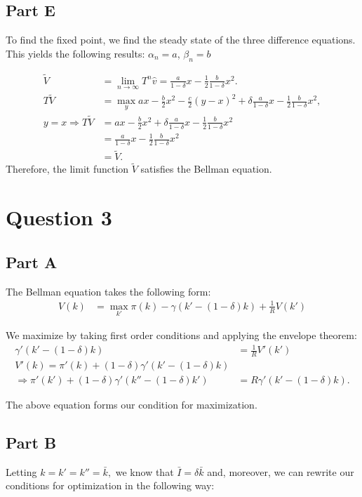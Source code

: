 \documentclass[11pt]{article} %
\begin{document}
\subsection{Part E}
To find the fixed point, we find the steady state of the three difference equations. This yields the following results: $\alpha_n = a$, $\beta_n = b$

\begin{align*}
\tilde{V} &= \lim_{n\rightarrow \infty} T^n \hat{v} = \frac{a}{1-\delta}x - \frac{1}{2}\frac{b}{1-\delta}x^2.\\
T\tilde{V} &= \max_{y} ax - \frac{b}{2}x^2 - \frac{c}{2}(y-x)^2 + \delta \frac{a}{1-\delta}x - \frac{1}{2}\frac{b}{1-\delta}x^2,\\
y=x\Rightarrow T\tilde{V} &=  ax - \frac{b}{2}x^2 + \delta \frac{a}{1-\delta}x - \frac{1}{2}\frac{b}{1-\delta}x^2\\
&= \frac{a}{1-\delta}x - \frac{1}{2}\frac{b}{1-\delta}x^2\\
&= \tilde{V}.
\end{align*}
Therefore, the limit function $\tilde{V}$ satisfies the Bellman equation.
\section{Question 3}
\subsection{Part A}
The Bellman equation takes the following form:
\begin{align*}
V(k) &= \max_{k'} \pi (k) - \gamma(k' - (1-\delta)k) + \frac{1}{R}V(k')
\end{align*}

We maximize by taking first order conditions and applying the envelope theorem:
\begin{align*}
\gamma' (k' - (1-\delta)k) &= \frac{1}{R} V'(k')\\%
V'(k) = \pi'(k) + (1-\delta) \gamma ' (k' - (1-\delta)k)\\
\Rightarrow \pi '(k') + (1-\delta) \gamma ' (k'' - (1-\delta)k')&= R \gamma'(k' - (1-\delta)k).
\end{align*}

The above equation forms our condition for maximization.

\subsection{Part B}
Letting $k = k' = k'' = \bar{k},$ we know that $\bar{I} = \delta \bar{k}$ and, moreover, we can rewrite our conditions for optimization in the following way:
\end{document}

